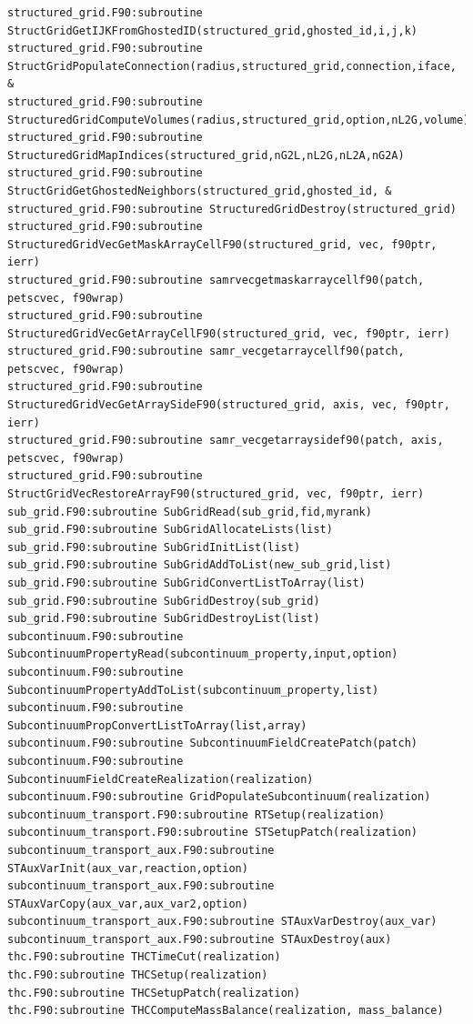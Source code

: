 \documentclass[12pt]{article}
\begin{document}
\begin{verbatim}
structured_grid.F90:subroutine StructGridGetIJKFromGhostedID(structured_grid,ghosted_id,i,j,k)
structured_grid.F90:subroutine StructGridPopulateConnection(radius,structured_grid,connection,iface, &
structured_grid.F90:subroutine StructuredGridComputeVolumes(radius,structured_grid,option,nL2G,volume)
structured_grid.F90:subroutine StructuredGridMapIndices(structured_grid,nG2L,nL2G,nL2A,nG2A)
structured_grid.F90:subroutine StructGridGetGhostedNeighbors(structured_grid,ghosted_id, &
structured_grid.F90:subroutine StructuredGridDestroy(structured_grid)
structured_grid.F90:subroutine StructuredGridVecGetMaskArrayCellF90(structured_grid, vec, f90ptr, ierr)
structured_grid.F90:subroutine samrvecgetmaskarraycellf90(patch, petscvec, f90wrap)
structured_grid.F90:subroutine StructuredGridVecGetArrayCellF90(structured_grid, vec, f90ptr, ierr)
structured_grid.F90:subroutine samr_vecgetarraycellf90(patch, petscvec, f90wrap)
structured_grid.F90:subroutine StructuredGridVecGetArraySideF90(structured_grid, axis, vec, f90ptr, ierr)
structured_grid.F90:subroutine samr_vecgetarraysidef90(patch, axis, petscvec, f90wrap)
structured_grid.F90:subroutine StructGridVecRestoreArrayF90(structured_grid, vec, f90ptr, ierr)
sub_grid.F90:subroutine SubGridRead(sub_grid,fid,myrank)
sub_grid.F90:subroutine SubGridAllocateLists(list)
sub_grid.F90:subroutine SubGridInitList(list)
sub_grid.F90:subroutine SubGridAddToList(new_sub_grid,list)
sub_grid.F90:subroutine SubGridConvertListToArray(list)
sub_grid.F90:subroutine SubGridDestroy(sub_grid)
sub_grid.F90:subroutine SubGridDestroyList(list)
subcontinuum.F90:subroutine SubcontinuumPropertyRead(subcontinuum_property,input,option)
subcontinuum.F90:subroutine SubcontinuumPropertyAddToList(subcontinuum_property,list)
subcontinuum.F90:subroutine SubcontinuumPropConvertListToArray(list,array)
subcontinuum.F90:subroutine SubcontinuumFieldCreatePatch(patch)
subcontinuum.F90:subroutine SubcontinuumFieldCreateRealization(realization)
subcontinuum.F90:subroutine GridPopulateSubcontinuum(realization)
subcontinuum_transport.F90:subroutine RTSetup(realization)
subcontinuum_transport.F90:subroutine STSetupPatch(realization)
subcontinuum_transport_aux.F90:subroutine STAuxVarInit(aux_var,reaction,option)
subcontinuum_transport_aux.F90:subroutine STAuxVarCopy(aux_var,aux_var2,option)
subcontinuum_transport_aux.F90:subroutine STAuxVarDestroy(aux_var)
subcontinuum_transport_aux.F90:subroutine STAuxDestroy(aux)
thc.F90:subroutine THCTimeCut(realization)
thc.F90:subroutine THCSetup(realization)
thc.F90:subroutine THCSetupPatch(realization)
thc.F90:subroutine THCComputeMassBalance(realization, mass_balance)

\end{verbatim}
\end{document}
